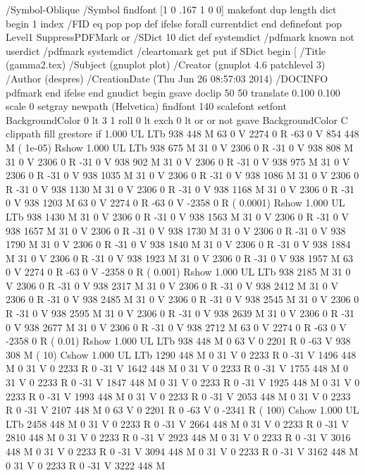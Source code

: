 %
/Symbol-Oblique /Symbol findfont [1 0 .167 1 0 0] makefont
dup length dict begin {1 index /FID eq {pop pop} {def} ifelse} forall
currentdict end definefont pop
Level1 SuppressPDFMark or 
{} {
/SDict 10 dict def
systemdict /pdfmark known not {
  userdict /pdfmark systemdict /cleartomark get put
} if
SDict begin [
  /Title (gamma2.tex)
  /Subject (gnuplot plot)
  /Creator (gnuplot 4.6 patchlevel 3)
  /Author (despres)
  /CreationDate (Thu Jun 26 08:57:03 2014)
  /DOCINFO pdfmark
end
} ifelse
end
gnudict begin
gsave
doclip
50 50 translate
0.100 0.100 scale
0 setgray
newpath
(Helvetica) findfont 140 scalefont setfont
BackgroundColor 0 lt 3 1 roll 0 lt exch 0 lt or or not {gsave BackgroundColor C clippath fill grestore} if
1.000 UL
LTb
938 448 M
63 0 V
2274 0 R
-63 0 V
854 448 M
( 1e-05) Rshow
1.000 UL
LTb
938 675 M
31 0 V
2306 0 R
-31 0 V
938 808 M
31 0 V
2306 0 R
-31 0 V
938 902 M
31 0 V
2306 0 R
-31 0 V
938 975 M
31 0 V
2306 0 R
-31 0 V
938 1035 M
31 0 V
2306 0 R
-31 0 V
938 1086 M
31 0 V
2306 0 R
-31 0 V
938 1130 M
31 0 V
2306 0 R
-31 0 V
938 1168 M
31 0 V
2306 0 R
-31 0 V
938 1203 M
63 0 V
2274 0 R
-63 0 V
-2358 0 R
( 0.0001) Rshow
1.000 UL
LTb
938 1430 M
31 0 V
2306 0 R
-31 0 V
938 1563 M
31 0 V
2306 0 R
-31 0 V
938 1657 M
31 0 V
2306 0 R
-31 0 V
938 1730 M
31 0 V
2306 0 R
-31 0 V
938 1790 M
31 0 V
2306 0 R
-31 0 V
938 1840 M
31 0 V
2306 0 R
-31 0 V
938 1884 M
31 0 V
2306 0 R
-31 0 V
938 1923 M
31 0 V
2306 0 R
-31 0 V
938 1957 M
63 0 V
2274 0 R
-63 0 V
-2358 0 R
( 0.001) Rshow
1.000 UL
LTb
938 2185 M
31 0 V
2306 0 R
-31 0 V
938 2317 M
31 0 V
2306 0 R
-31 0 V
938 2412 M
31 0 V
2306 0 R
-31 0 V
938 2485 M
31 0 V
2306 0 R
-31 0 V
938 2545 M
31 0 V
2306 0 R
-31 0 V
938 2595 M
31 0 V
2306 0 R
-31 0 V
938 2639 M
31 0 V
2306 0 R
-31 0 V
938 2677 M
31 0 V
2306 0 R
-31 0 V
938 2712 M
63 0 V
2274 0 R
-63 0 V
-2358 0 R
( 0.01) Rshow
1.000 UL
LTb
938 448 M
0 63 V
0 2201 R
0 -63 V
938 308 M
( 10) Cshow
1.000 UL
LTb
1290 448 M
0 31 V
0 2233 R
0 -31 V
1496 448 M
0 31 V
0 2233 R
0 -31 V
1642 448 M
0 31 V
0 2233 R
0 -31 V
1755 448 M
0 31 V
0 2233 R
0 -31 V
1847 448 M
0 31 V
0 2233 R
0 -31 V
1925 448 M
0 31 V
0 2233 R
0 -31 V
1993 448 M
0 31 V
0 2233 R
0 -31 V
2053 448 M
0 31 V
0 2233 R
0 -31 V
2107 448 M
0 63 V
0 2201 R
0 -63 V
0 -2341 R
( 100) Cshow
1.000 UL
LTb
2458 448 M
0 31 V
0 2233 R
0 -31 V
2664 448 M
0 31 V
0 2233 R
0 -31 V
2810 448 M
0 31 V
0 2233 R
0 -31 V
2923 448 M
0 31 V
0 2233 R
0 -31 V
3016 448 M
0 31 V
0 2233 R
0 -31 V
3094 448 M
0 31 V
0 2233 R
0 -31 V
3162 448 M
0 31 V
0 2233 R
0 -31 V
3222 448 M
